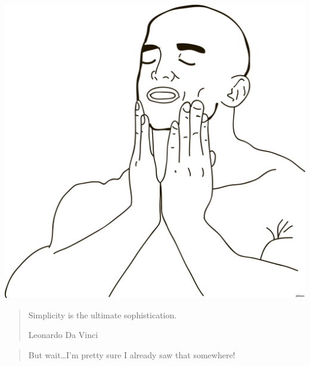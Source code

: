 \begin{frame}[fragile,c]
    \begin{center}
        \includegraphics[height=\textheight]{src/session--composition-and-inheritance/meme/feels-good.png}
    \end{center}
\end{frame}

\begin{frame}
    \begin{quote}
        Simplicity is the ultimate sophistication.

        \vspace{5 mm}

        \hfill Leonardo Da Vinci
    \end{quote}
\end{frame}

\begin{frame}
    \begin{quote}
        But wait\ldots \pause I'm pretty sure I already saw that somewhere!
    \end{quote}
\end{frame}


